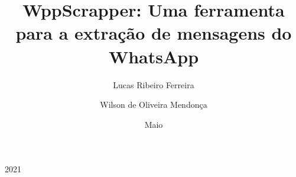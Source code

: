 \documentclass{projetofinal-dcc}
\begin{document}
\title{WppScrapper: Uma ferramenta para a extração de mensagens do WhatsApp}

\author{Lucas Ribeiro Ferreira}{}
\author{Wilson de Oliveira Mendonça}{}





\date{Maio}{2021}
\maketitle

\startdocument

\makethankspage

\begin{abstract}{
  
}
\end{abstract}

\begin{englishabstract}{
  
}
\end{englishabstract}

\makefigurespage

\maketablespage




\maketocpage

\startcontent





% 
% 
\pagebreak



%
\end{document}
